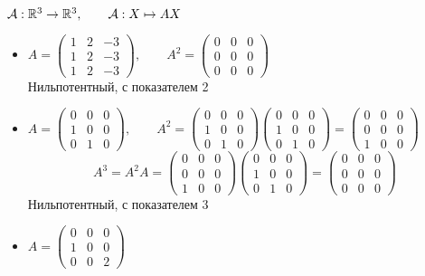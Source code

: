 \begin{egs}
	$ \mathcal{A} : \mathbb{R}^3 \to \mathbb{R}^3, \qquad \mathcal{A} : X \mapsto AX $
	\begin{itemize}
		\item $ A =
		\begin{pmatrix}
			1 & 2 & -3 \\
			1 & 2 & -3 \\
			1 & 2 & -3
		\end{pmatrix}, \qquad A^2 =
		\begin{pmatrix}
			0 & 0 & 0 \\
			0 & 0 & 0 \\
			0 & 0 & 0
		\end{pmatrix} $ \\
		Нильпотентный, с показателем 2
		\item $ A =
		\begin{pmatrix}
			0 & 0 & 0 \\
			1 & 0 & 0 \\
			0 & 1 & 0
		\end{pmatrix}, \qquad A^2 =
		\begin{pmatrix}
			0 & 0 & 0 \\
			1 & 0 & 0 \\
			0 & 1 & 0
		\end{pmatrix}
		\begin{pmatrix}
			0 & 0 & 0 \\
			1 & 0 & 0 \\
			0 & 1 & 0
		\end{pmatrix} =
		\begin{pmatrix}
			0 & 0 & 0 \\
			0 & 0 & 0 \\
			1 & 0 & 0
		\end{pmatrix} $
		$$ A^3 = A^2 A =
		\begin{pmatrix}
			0 & 0 & 0 \\
			0 & 0 & 0 \\
			1 & 0 & 0
		\end{pmatrix}
		\begin{pmatrix}
			0 & 0 & 0 \\
			1 & 0 & 0 \\
			0 & 1 & 0
		\end{pmatrix} =
		\begin{pmatrix}
			0 & 0 & 0 \\
			0 & 0 & 0 \\
			0 & 0 & 0
		\end{pmatrix} $$
		Нильпотентный, с показателем 3
		\item $ A =
		\begin{pmatrix}
			0 & 0 & 0 \\
			1 & 0 & 0 \\
			0 & 0 & 2
		\end{pmatrix} $
	\end{itemize}
\end{egs}
